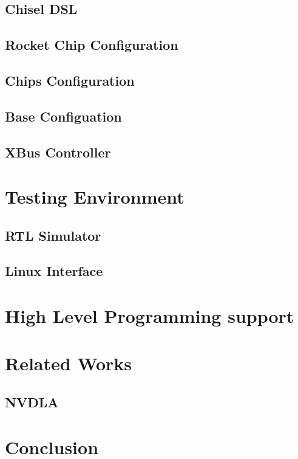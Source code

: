 \subsection{Chisel DSL}
\blindtext
\blindtext
\subsection{Rocket Chip Configuration}
\blindtext
\subsection{Chips Configuration}
\blindtext
\subsection{Base Configuation}
\blindtext
\subsection{XBus Controller}
\blindtext
\section{Testing Environment}
\blindtext
\subsection{RTL Simulator}
\blindtext
\subsection{Linux Interface}
\blindtext

\section{High Level Programming support}
\blindtext

\section{Related Works}
\blindtext
\subsection{NVDLA}
\blindtext

\section{Conclusion}
\blindtext

\blindtext






